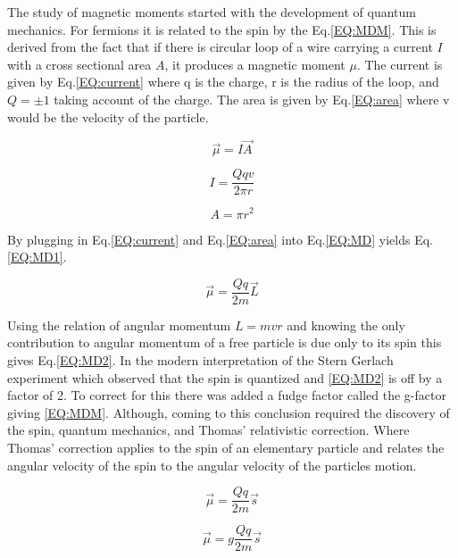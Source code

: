 \documentclass[./Thesis]{subfiles}
\begin{document}
The study of magnetic moments started with the development of quantum mechanics.  For fermions it is related to the spin by the Eq.\ref{EQ:MDM}. This is derived from the fact that if there is circular loop of a wire carrying a current $I$ with a cross sectional area $A$, it produces a magnetic moment $\mu$.  The current is given by Eq.\ref{EQ:current} where q is the charge, r is the radius of the loop, and $Q=\pm1$ taking account of the charge. The area is given by Eq.\ref{EQ:area} where v would be the velocity of the particle.

	\begin{equation}\label{EQ:MD}
	\vec{\mu} = I\vec{A} 
	\end{equation}

	\begin{equation}\label{EQ:current}
	I = \frac{Qqv}{2\pi r}
	\end{equation}
	
	\begin{equation}\label{EQ:area}
	A = \pi r^2
	\end{equation}
	
 By plugging in Eq.\ref{EQ:current} and Eq.\ref{EQ:area} into Eq.\ref{EQ:MD}  yields Eq.\ref{EQ:MD1}.

	\begin{equation}\label{EQ:MD1}
	\vec{\mu} = \frac{Qq}{2m}\vec{L}
	\end{equation}

Using the relation of angular momentum $L = mvr$ and knowing the only contribution to angular momentum of a free particle is due only to its spin this gives Eq.\ref{EQ:MD2}.  In the modern interpretation of the Stern Gerlach experiment which observed that the spin is quantized and \ref{EQ:MD2} is off by a factor of 2.\cite{Stern} To correct for this there was added a fudge factor called the g-factor giving \ref{EQ:MDM}.  Although, coming to this conclusion required the discovery of the spin, quantum mechanics, and Thomas' relativistic correction. Where Thomas' correction applies to the spin of an elementary particle and relates the angular velocity of the spin to the angular velocity of the particles motion.

	\begin{equation}\label{EQ:MD2}
	\vec{\mu} = \frac{Qq}{2m}\vec{s}
	\end{equation}


	\begin{equation}\label{EQ:MDM}
	\vec{\mu} = g \frac{Qq}{2m} \vec{s}
	\end{equation}
	
\end{document}

